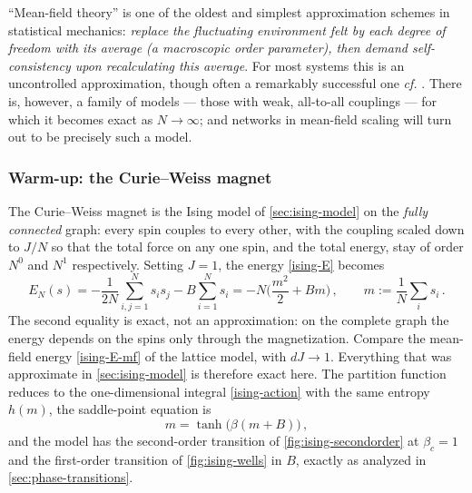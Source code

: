 \documentclass[11pt]{article}
\newcommand{\expval}[1]{\left\langle #1 \right\rangle}
\begin{document}
``Mean-field theory'' is one of the oldest and simplest approximation schemes in statistical mechanics: \emph{replace the fluctuating environment felt by each degree of freedom with its average (a macroscopic order parameter), then demand self-consistency upon recalculating this average}. For most systems this is an uncontrolled approximation, though often a remarkably successful one \emph{cf.} \cite[Chapter 1]{TongSFT}. There is, however, a family of models --- those with weak, all-to-all couplings --- for which it becomes exact as $N\to\infty$; and networks in mean-field scaling will turn out to be precisely such a model.




\subsubsection{Warm-up: the Curie--Weiss magnet}

The Curie--Weiss magnet is the Ising model of \cref{sec:ising-model} on the \emph{fully connected} graph: every spin couples to every other, with the coupling scaled down to $J/N$ so that the total force on any one spin, and the total energy, stay of order $N^0$ and $N^1$ respectively. Setting $J=1$, the energy \eqref{ising-E} becomes
%
\begin{equation} \label{cw-H}
    E_N(s) = -\frac{1}{2N}\sum_{i,j=1}^N s_i s_j - B \sum_{i=1}^N s_i = -N\Big(\frac{m^2}{2}+Bm\Big)\,,\qquad m := \frac{1}{N}\sum_i s_i\,.
\end{equation}
%
The second equality is exact, not an approximation: on the complete graph the energy depends on the spins only through the magnetization. Compare the mean-field energy \eqref{ising-E-mf} of the lattice model, with $dJ\to 1$. Everything that was approximate in \cref{sec:ising-model} is therefore exact here. The partition function reduces to the one-dimensional integral \eqref{ising-action} with the same entropy $h(m)$, the saddle-point equation is
%
\begin{equation} \label{cw-sc}
    m = \tanh\big(\beta(m+B)\big)\,,
\end{equation}
%
and the model has the second-order transition of \cref{fig:ising-secondorder} at $\beta_c = 1$ and the first-order transition of \cref{fig:ising-wells} in $B$, exactly as analyzed in \cref{sec:phase-transitions}.
\end{document}
